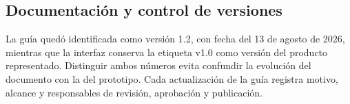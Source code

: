 \subsection{Documentación y control de versiones}

La guía quedó identificada como versión 1.2, con fecha del 13 de agosto de 2026, mientras que
la interfaz conserva la etiqueta v1.0 como versión del producto representado. Distinguir ambos
números evita confundir la evolución del documento con la del prototipo. Cada actualización de
la guía registra motivo, alcance y responsables de revisión, aprobación y publicación.


\clearpage
